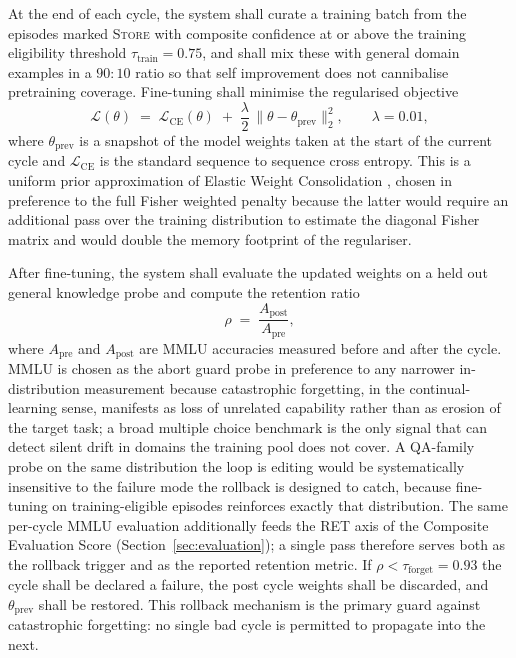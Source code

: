 At the end of each cycle, the system shall curate a training batch from the episodes marked \textsc{Store} with composite confidence at or above the training eligibility threshold $\tau_{\text{train}} = 0.75$, and shall mix these with general domain examples in a $90{:}10$ ratio so that self improvement does not cannibalise pretraining coverage. Fine-tuning shall minimise the regularised objective
\begin{equation}
\mathcal{L}(\theta) \;=\; \mathcal{L}_{\mathrm{CE}}(\theta) \;+\; \frac{\lambda}{2} \, \lVert \theta - \theta_{\mathrm{prev}} \rVert_{2}^{2},
\qquad \lambda = 0.01,
\label{eq:l2anchor}
\end{equation}
where $\theta_{\mathrm{prev}}$ is a snapshot of the model weights taken at the start of the current cycle and $\mathcal{L}_{\mathrm{CE}}$ is the standard sequence to sequence cross entropy. This is a uniform prior approximation of Elastic Weight Consolidation \cite{doi:10.1073/pnas.1611835114}, chosen in preference to the full Fisher weighted penalty because the latter would require an additional pass over the training distribution to estimate the diagonal Fisher matrix and would double the memory footprint of the regulariser.

After fine-tuning, the system shall evaluate the updated weights on a held out general knowledge probe and compute the retention ratio
\begin{equation}
\rho \;=\; \frac{A_{\text{post}}}{A_{\text{pre}}},
\label{eq:retention}
\end{equation}
where $A_{\text{pre}}$ and $A_{\text{post}}$ are MMLU accuracies measured before and after the cycle. MMLU is chosen as the abort guard probe in preference to any narrower in-distribution measurement because catastrophic forgetting, in the continual-learning sense, manifests as loss of unrelated capability rather than as erosion of the target task; a broad multiple choice benchmark is the only signal that can detect silent drift in domains the training pool does not cover. A QA-family probe on the same distribution the loop is editing would be systematically insensitive to the failure mode the rollback is designed to catch, because fine-tuning on training-eligible episodes reinforces exactly that distribution. The same per-cycle MMLU evaluation additionally feeds the RET axis of the Composite Evaluation Score (Section~\ref{sec:evaluation}); a single pass therefore serves both as the rollback trigger and as the reported retention metric. If $\rho < \tau_{\text{forget}} = 0.93$ the cycle shall be declared a failure, the post cycle weights shall be discarded, and $\theta_{\mathrm{prev}}$ shall be restored. This rollback mechanism is the primary guard against catastrophic forgetting: no single bad cycle is permitted to propagate into the next.

